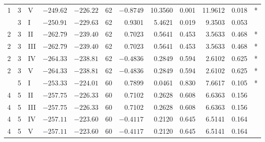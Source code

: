 \begin{landscape}
\begin{longtable}[t]{rrlrrrrrrrl}
1 & 3 & V & $-249.62$ & $-226.22$ & 62 & $-0.8749$ & 10.3560 & 0.001 & 11.9612 & 0.018 & * \\
 & 3 & I & $-250.91$ & $-229.63$ & 62 & 0.9301 & 5.4621 & 0.019 & 9.3503 & 0.053 & \\
2 & 3 & II & $-262.79$ & $-239.40$ & 62 & 0.7023 & 0.5641 & 0.453 & 3.5633 & 0.468 & * \\
2 & 3 & III & $-262.79$ & $-239.40$ & 62 & 0.7023 & 0.5641 & 0.453 & 3.5633 & 0.468 & * \\
2 & 3 & IV & $-264.33$ & $-238.81$ & 62 & $-0.4836$ & 0.2849 & 0.594 & 2.6102 & 0.625 & * \\
2 & 3 & V & $-264.33$ & $-238.81$ & 62 & $-0.4836$ & 0.2849 & 0.594 & 2.6102 & 0.625 & * \\
 & 5 & I & $-253.33$ & $-224.01$ & 60 & 0.7899 & 0.0461 & 0.830 & 7.6617 & 0.105 & * \\
4 & 5 & II & $-257.75$ & $-226.33$ & 60 & 0.7102 & 0.2628 & 0.608 & 6.6363 & 0.156 & \\
4 & 5 & III & $-257.75$ & $-226.33$ & 60 & 0.7102 & 0.2628 & 0.608 & 6.6363 & 0.156 & \\
4 & 5 & IV & $-257.11$ & $-223.60$ & 60 & $-0.4117$ & 0.2120 & 0.645 & 6.5141 & 0.164 & \\
4 & 5 & V & $-257.11$ & $-223.60$ & 60 & $-0.4117$ & 0.2120 & 0.645 & 6.5141 & 0.164 & \\
\bottomrule
\end{longtable}
\end{landscape}